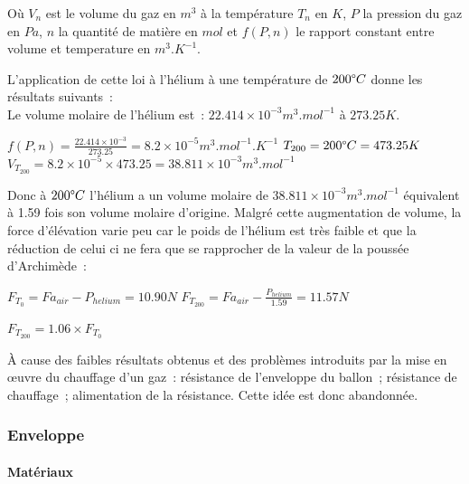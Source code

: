 \documentclass[a4paper,11pt]{article}
\begin{document}
Où $V_n$ est le volume du gaz en $m^3$ à la température $T_n$ en $K$, $P$ la pression du gaz en $Pa$, $n$ la quantité de matière en $mol$ et $f(P, n)$ le rapport constant entre volume et temperature en $m^3.K^{-1}$.

L'application de cette loi à l'hélium à une température de $200 \degree C $ donne les résultats suivants~: \\

Le volume molaire de l'hélium est~: $22.414\times 10^{-3} m^3.mol^{-1}$ à $273.25K$. \\

\begin{center}
	$\displaystyle{f(P, n) = \frac{22.414\times 10^{-3}}{273.25} = 8.2\times 10^{-5} m^3.mol^{-1}.K^{-1}}$
	\bigbreak
	$T_{200} = 200 \degree C = 473.25K$
	\medbreak
	$\displaystyle{V_{T_{200}} = 8.2\times 10^{-5} \times 473.25 = 38.811 \times 10^{-3}} m^3.mol^{-1}$
\end{center}

Donc à $200 \degree C$ l'hélium a un volume molaire de $38.811 \times 10^{-3} m^3.mol^{-1}$ équivalent à 1.59 fois son volume molaire d'origine. Malgré cette augmentation de volume, la force d'élévation varie peu car le poids de l'hélium est très faible et que la réduction de celui ci ne fera que se rapprocher de la valeur de la poussée d'Archimède~: \\

\begin{center}
  $\displaystyle{F_{T_0} = Fa_{air} - P_{helium} = 10.90 N}$
  \bigbreak
  $\displaystyle{F_{T_{200}} = Fa_{air} - \frac{P_{helium}}{1.59} = 11.57 N}$ \\
\end{center}

$F_{T_{200}} = 1.06 \times F_{T_0}$

À cause des faibles résultats obtenus et des problèmes introduits par la mise en œuvre du chauffage d'un gaz~: résistance de l'enveloppe du ballon~; résistance de chauffage~; alimentation de la résistance. Cette idée est donc abandonnée.

\subsubsection{Enveloppe}

\paragraph{Matériaux}
\end{document}
